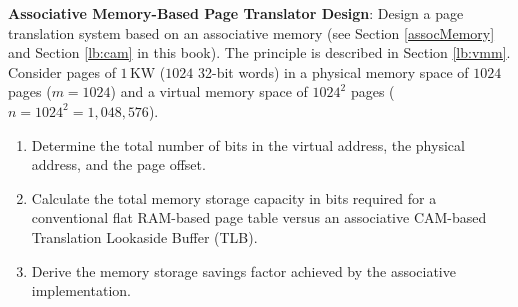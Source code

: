 \begin{problem}
\textbf{Associative Memory-Based Page Translator Design}:
Design a page translation system based on an associative memory (see Section \ref{assocMemory} and Section \ref{lb:cam} in this book). The principle is described in Section \ref{lb:vmm}. Consider pages of $1\,\text{KW}$ ($1024$ 32-bit words) in a physical memory space of $1024$ pages ($m = 1024$) and a virtual memory space of $1024^2$ pages ($n = 1024^2 = 1{,}048{,}576$).
\begin{enumerate}
    \item Determine the total number of bits in the virtual address, the physical address, and the page offset.
    \item Calculate the total memory storage capacity in bits required for a conventional flat RAM-based page table versus an associative CAM-based Translation Lookaside Buffer (TLB).
    \item Derive the memory storage savings factor achieved by the associative implementation.
\end{enumerate}


\end{problem}
